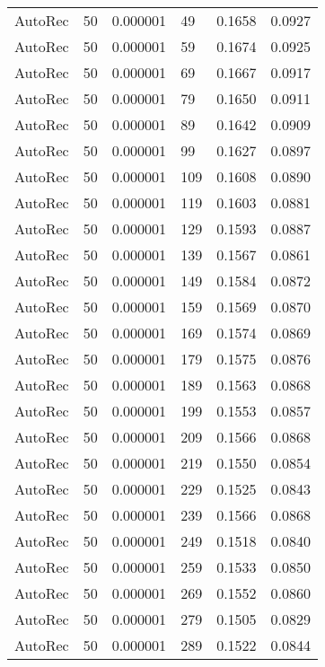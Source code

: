 \begin{tabular}{llrlrr}
 AutoRec &   50 &  0.000001 &    49 &  0.1658 &       0.0927 \\
 AutoRec &   50 &  0.000001 &    59 &  0.1674 &       0.0925 \\
 AutoRec &   50 &  0.000001 &    69 &  0.1667 &       0.0917 \\
 AutoRec &   50 &  0.000001 &    79 &  0.1650 &       0.0911 \\
 AutoRec &   50 &  0.000001 &    89 &  0.1642 &       0.0909 \\
 AutoRec &   50 &  0.000001 &    99 &  0.1627 &       0.0897 \\
 AutoRec &   50 &  0.000001 &   109 &  0.1608 &       0.0890 \\
 AutoRec &   50 &  0.000001 &   119 &  0.1603 &       0.0881 \\
 AutoRec &   50 &  0.000001 &   129 &  0.1593 &       0.0887 \\
 AutoRec &   50 &  0.000001 &   139 &  0.1567 &       0.0861 \\
 AutoRec &   50 &  0.000001 &   149 &  0.1584 &       0.0872 \\
 AutoRec &   50 &  0.000001 &   159 &  0.1569 &       0.0870 \\
 AutoRec &   50 &  0.000001 &   169 &  0.1574 &       0.0869 \\
 AutoRec &   50 &  0.000001 &   179 &  0.1575 &       0.0876 \\
 AutoRec &   50 &  0.000001 &   189 &  0.1563 &       0.0868 \\
 AutoRec &   50 &  0.000001 &   199 &  0.1553 &       0.0857 \\
 AutoRec &   50 &  0.000001 &   209 &  0.1566 &       0.0868 \\
 AutoRec &   50 &  0.000001 &   219 &  0.1550 &       0.0854 \\
 AutoRec &   50 &  0.000001 &   229 &  0.1525 &       0.0843 \\
 AutoRec &   50 &  0.000001 &   239 &  0.1566 &       0.0868 \\
 AutoRec &   50 &  0.000001 &   249 &  0.1518 &       0.0840 \\
 AutoRec &   50 &  0.000001 &   259 &  0.1533 &       0.0850 \\
 AutoRec &   50 &  0.000001 &   269 &  0.1552 &       0.0860 \\
 AutoRec &   50 &  0.000001 &   279 &  0.1505 &       0.0829 \\
 AutoRec &   50 &  0.000001 &   289 &  0.1522 &       0.0844 \\

\end{tabular}
